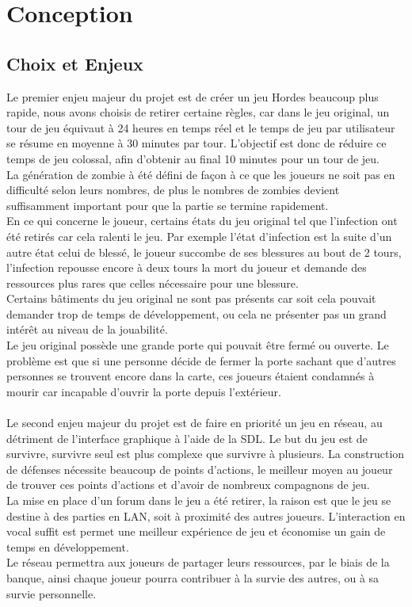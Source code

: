 \documentclass[a4paper,11pt]{article}
\begin{document}
\newpage

\section {Conception}

\subsection{Choix et Enjeux}
Le premier enjeu majeur du projet est de créer un jeu Hordes beaucoup plus rapide, nous avons choisis de retirer certaine règles, car dans le jeu original, un tour de jeu équivaut à 24 heures en temps réel et le temps de jeu par utilisateur se résume en moyenne à 30 minutes par tour. L'objectif est donc de réduire ce temps de jeu colossal, afin d'obtenir au final 10 minutes pour un tour de jeu.
\\
La génération de zombie à été défini de façon à ce que les joueurs ne soit pas en difficulté selon leurs nombres, de plus le nombres de zombies devient suffisamment important pour que la partie se termine rapidement.
\\
En ce qui concerne le joueur, certains états du jeu original tel que l'infection ont été retirés car cela ralenti le jeu. Par exemple l'état d'infection est la suite d'un autre état celui de blessé, le joueur succombe de ses blessures au bout de 2 tours, l'infection repousse encore à deux tours la mort du joueur et demande des ressources plus rares que celles nécessaire pour une blessure.
\\
Certains bâtiments du jeu original ne sont pas présents car soit cela pouvait demander trop de temps de développement, ou cela ne présenter pas un grand intérêt au niveau de la jouabilité.
\\
Le jeu original possède une grande porte qui pouvait être fermé ou ouverte. Le problème est que si une personne décide de fermer la porte sachant que d'autres personnes se trouvent encore dans la carte, ces joueurs étaient condamnés à mourir car incapable d'ouvrir la porte depuis l'extérieur.
\\
\\
Le second enjeu majeur du projet est de faire en priorité un jeu en réseau, au détriment de l'interface graphique à l'aide de la SDL. Le but du jeu est de survivre, survivre seul est plus complexe que survivre à plusieurs. La construction de défenses nécessite beaucoup de points d'actions, le meilleur moyen au joueur de trouver ces points d'actions et d'avoir de nombreux compagnons de jeu.
\\
La mise en place d'un forum dans le jeu a été retirer, la raison est que le jeu se destine à des parties en LAN, soit à proximité des autres joueurs. L'interaction en vocal suffit est permet une meilleur expérience de jeu et économise un gain de temps en  développement.
\\
Le réseau permettra aux joueurs de partager leurs ressources, par le biais de la banque, ainsi chaque joueur pourra contribuer à la survie des autres, ou à sa survie personnelle.
\end{document}
